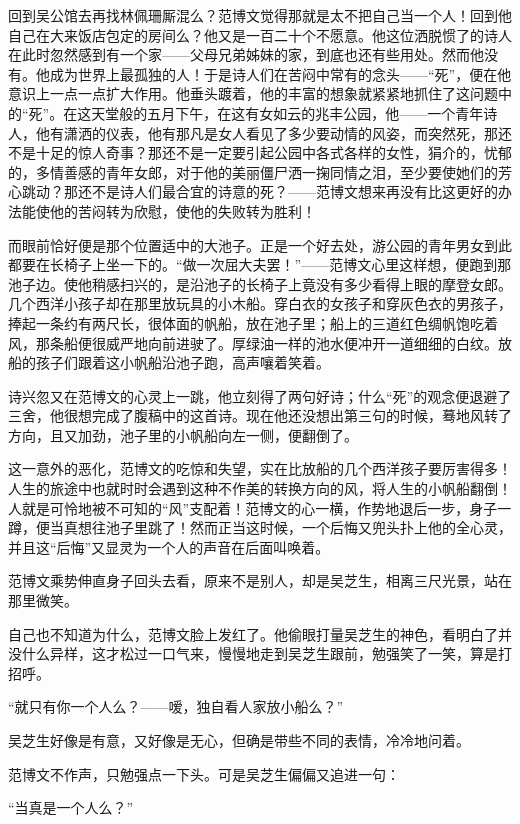 \par 回到吴公馆去再找林佩珊厮混么？范博文觉得那就是太不把自己当一个人！回到他自己在大来饭店包定的房间么？他又是一百二十个不愿意。他这位洒脱惯了的诗人在此时忽然感到有一个家——父母兄弟姊妹的家，到底也还有些用处。然而他没有。他成为世界上最孤独的人！于是诗人们在苦闷中常有的念头——“死”，便在他意识上一点一点扩大作用。他垂头踱着，他的丰富的想象就紧紧地抓住了这问题中的“死”。在这天堂般的五月下午，在这有女如云的兆丰公园，他——一个青年诗人，他有潇洒的仪表，他有那凡是女人看见了多少要动情的风姿，而突然死，那还不是十足的惊人奇事？那还不是一定要引起公园中各式各样的女性，狷介的，忧郁的，多情善感的青年女郎，对于他的美丽僵尸洒一掬同情之泪，至少要使她们的芳心跳动？那还不是诗人们最合宜的诗意的死？——范博文想来再没有比这更好的办法能使他的苦闷转为欣慰，使他的失败转为胜利！
\par 而眼前恰好便是那个位置适中的大池子。正是一个好去处，游公园的青年男女到此都要在长椅子上坐一下的。“做一次屈大夫罢！”——范博文心里这样想，便跑到那池子边。使他稍感扫兴的，是沿池子的长椅子上竟没有多少看得上眼的摩登女郎。几个西洋小孩子却在那里放玩具的小木船。穿白衣的女孩子和穿灰色衣的男孩子，捧起一条约有两尺长，很体面的帆船，放在池子里；船上的三道红色绸帆饱吃着风，那条船便很威严地向前进驶了。厚绿油一样的池水便冲开一道细细的白纹。放船的孩子们跟着这小帆船沿池子跑，高声嚷着笑着。
\par 诗兴忽又在范博文的心灵上一跳，他立刻得了两句好诗；什么“死”的观念便退避了三舍，他很想完成了腹稿中的这首诗。现在他还没想出第三句的时候，蓦地风转了方向，且又加劲，池子里的小帆船向左一侧，便翻倒了。
\par 这一意外的恶化，范博文的吃惊和失望，实在比放船的几个西洋孩子要厉害得多！人生的旅途中也就时时会遇到这种不作美的转换方向的风，将人生的小帆船翻倒！人就是可怜地被不可知的“风”支配着！范博文的心一横，作势地退后一步，身子一蹲，便当真想往池子里跳了！然而正当这时候，一个后悔又兜头扑上他的全心灵，并且这“后悔”又显灵为一个人的声音在后面叫唤着。
\par 范博文乘势伸直身子回头去看，原来不是别人，却是吴芝生，相离三尺光景，站在那里微笑。
\par 自己也不知道为什么，范博文脸上发红了。他偷眼打量吴芝生的神色，看明白了并没什么异样，这才松过一口气来，慢慢地走到吴芝生跟前，勉强笑了一笑，算是打招呼。
\par “就只有你一个人么？——嗳，独自看人家放小船么？”
\par 吴芝生好像是有意，又好像是无心，但确是带些不同的表情，冷冷地问着。
\par 范博文不作声，只勉强点一下头。可是吴芝生偏偏又追进一句：
\par “当真是一个人么？”
